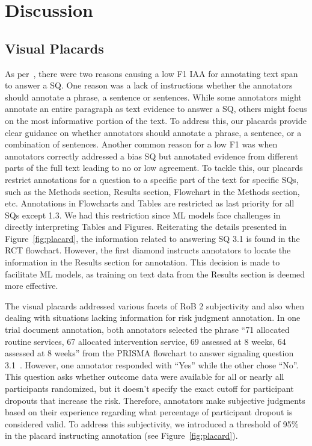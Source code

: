 \documentclass[sn-mathphys,Numbered]{sn-jnl}%
\theoremstyle{thmstyleone}%
\theoremstyle{thmstyletwo}%
\theoremstyle{thmstylethree}%
\begin{document}
\section{Discussion}
\label{sec:discussion}
%
\subsection{Visual Placards}
\label{disc:placards}
%
As per~\cite{dhrangadhariya2023first}, there were two reasons causing a low F1 IAA for annotating text span to answer a SQ.
One reason was a lack of instructions whether the annotators should annotate a phrase, a sentence or sentences.
While some annotators might annotate an entire paragraph as text evidence to answer a SQ, others might focus on the most informative portion of the text.
To address this, our placards provide clear guidance on whether annotators should annotate a phrase, a sentence, or a combination of sentences.
Another common reason for a low F1 was when annotators correctly addressed a bias SQ but annotated evidence from different parts of the full text leading to no or low agreement. 
To tackle this, our placards restrict annotations for a question to a specific part of the text for specific SQs, such as the Methods section, Results section, Flowchart in the Methods section, etc.
Annotations in Flowcharts and Tables are restricted as last priority for all SQs except 1.3.
We had this restriction since ML models face challenges in directly interpreting Tables and Figures.
Reiterating the details presented in Figure~\ref{fig:placard}, the information related to answering SQ 3.1 is found in the RCT flowchart.
However, the first diamond instructs annotators to locate the information in the Results section for annotation.
This decision is made to facilitate ML models, as training on text data from the Results section is deemed more effective.




The visual placards addressed various facets of RoB 2 subjectivity and also when dealing with situations lacking information for risk judgment annotation.
In one trial document annotation, both annotators selected the phrase ``71 allocated routine services, 67 allocated intervention service, 69 assessed at 8 weeks, 64 assessed at 8 weeks'' from the PRISMA flowchart to answer signaling question 3.1~\cite{gilbertson2000domiciliary}.
However, one annotator responded with ``Yes'' while the other chose ``No''.
This question asks whether outcome data were available for all or nearly all participants randomized, but it doesn't specify the exact cutoff for participant dropouts that increase the risk.
Therefore, annotators make subjective judgments based on their experience regarding what percentage of participant dropout is considered valid.
To address this subjectivity, we introduced a threshold of 95\% in the placard instructing annotation (see Figure~\ref{fig:placard}).
\end{document}

